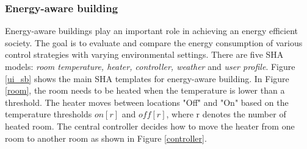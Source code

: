 \subsubsection{Energy-aware building}
Energy-aware buildings play an important role in achieving an energy efficient society. The goal is to evaluate and compare the energy consumption of various control strategies with varying environmental settings. There are five SHA models: \emph{room temperature, heater, controller, weather} and \emph{user profile}. Figure \ref{ui_sb} shows the main SHA templates for energy-aware building. In Figure \ref{room}, the room needs to be heated when the temperature is lower than a threshold. The heater moves between locations "Off" and "On" based on the temperature thresholds $on[r]$ and $off[r]$, where r denotes the number of heated room. The central controller decides how to move the heater from one room to another room as shown in Figure \ref{controller}.
\begin{figure}[htbp]
\end{figure}
